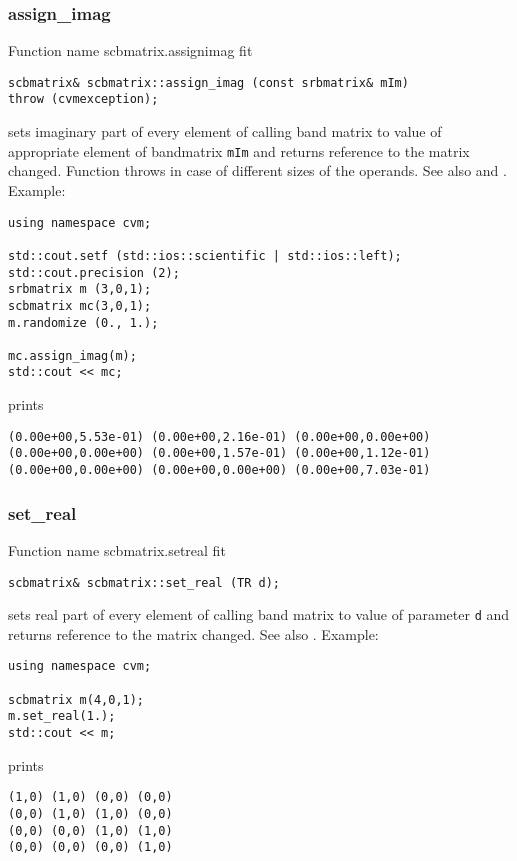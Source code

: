 \subsubsection{assign\_imag}
Function%
\pdfdest name {scbmatrix.assignimag} fit
\begin{verbatim}
scbmatrix& scbmatrix::assign_imag (const srbmatrix& mIm)
throw (cvmexception);
\end{verbatim}
sets imaginary part of every element of  calling band matrix to  value of
appropriate element of  bandmatrix \verb"mIm"
and returns  reference to
the matrix changed.
Function throws  
in case of different sizes of the operands.
See also  and .
Example:
\begin{Verbatim}
using namespace cvm;

std::cout.setf (std::ios::scientific | std::ios::left); 
std::cout.precision (2);
srbmatrix m (3,0,1);
scbmatrix mc(3,0,1);
m.randomize (0., 1.);

mc.assign_imag(m);
std::cout << mc;
\end{Verbatim}
prints
\begin{Verbatim}
(0.00e+00,5.53e-01) (0.00e+00,2.16e-01) (0.00e+00,0.00e+00)
(0.00e+00,0.00e+00) (0.00e+00,1.57e-01) (0.00e+00,1.12e-01)
(0.00e+00,0.00e+00) (0.00e+00,0.00e+00) (0.00e+00,7.03e-01)
\end{Verbatim}
\newpage




\subsubsection{set\_real}
Function%
\pdfdest name {scbmatrix.setreal} fit
\begin{verbatim}
scbmatrix& scbmatrix::set_real (TR d);
\end{verbatim}
sets real part of every element of  calling band matrix to  value of
parameter \verb"d"
and returns  reference to the matrix changed.
See also .
Example:
\begin{Verbatim}
using namespace cvm;

scbmatrix m(4,0,1);
m.set_real(1.);
std::cout << m;
\end{Verbatim}
prints
\begin{Verbatim}
(1,0) (1,0) (0,0) (0,0)
(0,0) (1,0) (1,0) (0,0)
(0,0) (0,0) (1,0) (1,0)
(0,0) (0,0) (0,0) (1,0)
\end{Verbatim}
\newpage





